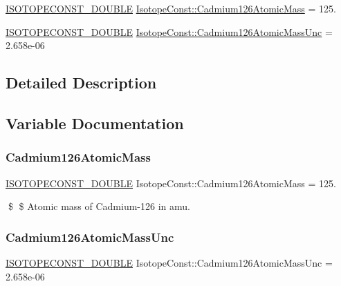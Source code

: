 \begin{DoxyCompactItemize}
\item 
\mbox{\hyperlink{group___isotope_const-_macros_ga8f45a7272ce02c0b4c65c44636ed719a}{I\+S\+O\+T\+O\+P\+E\+C\+O\+N\+S\+T\+\_\+\+D\+O\+U\+B\+LE}} \mbox{\hyperlink{group___isotope_const-_cadmium-_cd126_gabecf5d066d6d0f23903e5dd4ed57d216}{Isotope\+Const\+::\+Cadmium126\+Atomic\+Mass}} = 125.
\item 
\mbox{\hyperlink{group___isotope_const-_macros_ga8f45a7272ce02c0b4c65c44636ed719a}{I\+S\+O\+T\+O\+P\+E\+C\+O\+N\+S\+T\+\_\+\+D\+O\+U\+B\+LE}} \mbox{\hyperlink{group___isotope_const-_cadmium-_cd126_ga27f4c87d25eff71cf9318e8fe22ea91e}{Isotope\+Const\+::\+Cadmium126\+Atomic\+Mass\+Unc}} = 2.\+658e-\/06
\end{DoxyCompactItemize}


\subsection{Detailed Description}


\subsection{Variable Documentation}
\mbox{\label{group___isotope_const-_cadmium-_cd126_gabecf5d066d6d0f23903e5dd4ed57d216}} 
\subsubsection{\texorpdfstring{Cadmium126\+Atomic\+Mass}{Cadmium126AtomicMass}}
{\footnotesize\ttfamily \mbox{\hyperlink{group___isotope_const-_macros_ga8f45a7272ce02c0b4c65c44636ed719a}{I\+S\+O\+T\+O\+P\+E\+C\+O\+N\+S\+T\+\_\+\+D\+O\+U\+B\+LE}} Isotope\+Const\+::\+Cadmium126\+Atomic\+Mass = 125.}

\$ \$ Atomic mass of Cadmium-\/126 in amu. \mbox{\label{group___isotope_const-_cadmium-_cd126_ga27f4c87d25eff71cf9318e8fe22ea91e}} 
\subsubsection{\texorpdfstring{Cadmium126\+Atomic\+Mass\+Unc}{Cadmium126AtomicMassUnc}}
{\footnotesize\ttfamily \mbox{\hyperlink{group___isotope_const-_macros_ga8f45a7272ce02c0b4c65c44636ed719a}{I\+S\+O\+T\+O\+P\+E\+C\+O\+N\+S\+T\+\_\+\+D\+O\+U\+B\+LE}} Isotope\+Const\+::\+Cadmium126\+Atomic\+Mass\+Unc = 2.\+658e-\/06}

